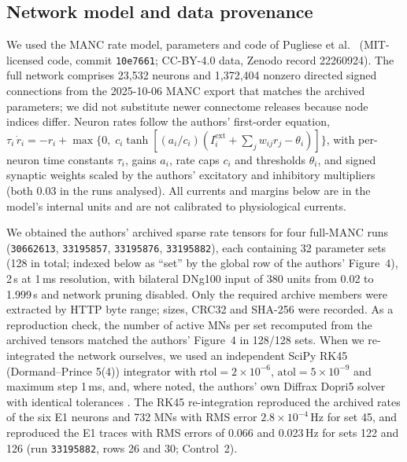 \documentclass[11pt]{article}
\begin{document}
\subsection{Network model and data provenance}
We used the MANC rate model, parameters and code of Pugliese et al.\ \citep{pugliese2026} (MIT-licensed code, commit \texttt{10e7661}; CC-BY-4.0 data, Zenodo record 22260924). The full network comprises 23,532 neurons and 1,372,404 nonzero directed signed connections from the 2025-10-06 MANC export that matches the archived parameters; we did not substitute newer connectome releases because node indices differ. Neuron rates follow the authors' first-order equation, $\tau_i\,\dot r_i=-r_i+\max\{0,\;c_i\tanh[(a_i/c_i)(I_i^{\text{ext}}+\sum_j w_{ij}r_j-\theta_i)]\}$, with per-neuron time constants $\tau_i$, gains $a_i$, rate caps $c_i$ and thresholds $\theta_i$, and signed synaptic weights scaled by the authors' excitatory and inhibitory multipliers (both 0.03 in the runs analysed). All currents and margins below are in the model's internal units and are not calibrated to physiological currents.

We obtained the authors' archived sparse rate tensors for four full-MANC runs (\texttt{30662613}, \texttt{33195857}, \texttt{33195876}, \texttt{33195882}), each containing 32 parameter sets (128 in total; indexed below as ``set'' by the global row of the authors' Figure~4), 2\,s at 1\,ms resolution, with bilateral DNg100 input of 380 units from 0.02 to 1.999\,s and network pruning disabled. Only the required archive members were extracted by HTTP byte range; sizes, CRC32 and SHA-256 were recorded. As a reproduction check, the number of active MNs per set recomputed from the archived tensors matched the authors' Figure~4 in 128/128 sets. When we re-integrated the network ourselves, we used an independent SciPy RK45 (Dormand--Prince 5(4)) integrator \citep{dormand1980} with $\mathrm{rtol}=2\times10^{-6}$, $\mathrm{atol}=5\times10^{-9}$ and maximum step 1\,ms, and, where noted, the authors' own Diffrax Dopri5 solver with identical tolerances \citep{kidger2021thesis}. The RK45 re-integration reproduced the archived rates of the six E1 neurons and 732 MNs with RMS error $2.8\times10^{-4}$\,Hz for set 45, and reproduced the E1 traces with RMS errors of 0.066 and 0.023\,Hz for sets 122 and 126 (run \texttt{33195882}, rows 26 and 30; Control~2).
\end{document}
